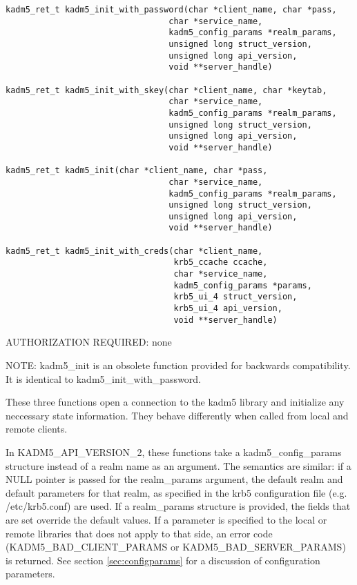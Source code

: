 \begin{verbatim}
kadm5_ret_t kadm5_init_with_password(char *client_name, char *pass,
                                 char *service_name,
                                 kadm5_config_params *realm_params,
                                 unsigned long struct_version,
                                 unsigned long api_version,
                                 void **server_handle)

kadm5_ret_t kadm5_init_with_skey(char *client_name, char *keytab,
                                 char *service_name,
                                 kadm5_config_params *realm_params,
                                 unsigned long struct_version,
                                 unsigned long api_version,
                                 void **server_handle)

kadm5_ret_t kadm5_init(char *client_name, char *pass,
                                 char *service_name,
                                 kadm5_config_params *realm_params,
                                 unsigned long struct_version,
                                 unsigned long api_version,
                                 void **server_handle)

kadm5_ret_t kadm5_init_with_creds(char *client_name,
                                  krb5_ccache ccache,
                                  char *service_name,
                                  kadm5_config_params *params,
                                  krb5_ui_4 struct_version,
                                  krb5_ui_4 api_version,
                                  void **server_handle)
\end{verbatim}

AUTHORIZATION REQUIRED: none

NOTE: kadm5_init is an obsolete function provided for backwards
compatibility.  It is identical to kadm5_init_with_password.

These three functions open a connection to the kadm5 library and
initialize any neccessary state information.  They behave differently
when called from local and remote clients.  

In KADM5_API_VERSION_2, these functions take a kadm5_config_params
structure instead of a realm name as an argument.  The semantics are
similar: if a NULL pointer is passed for the realm_params argument,
the default realm and default parameters for that realm, as specified
in the krb5 configuration file (e.g. /etc/krb5.conf) are used.  If a
realm_params structure is provided, the fields that are set override
the default values.  If a parameter is specified to the local or
remote libraries that does not apply to that side, an error code
(KADM5_BAD_CLIENT_PARAMS or KADM5_BAD_SERVER_PARAMS) is returned.  See
section \ref{sec:configparams} for a discussion of configuration
parameters.

